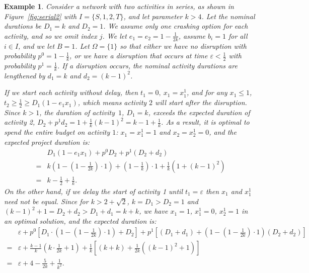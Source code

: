 \documentclass[11pt]{article}
\newtheorem{example}{Example}
\begin{document}
	\begin{example} \label{eg:delay}
		Consider a network with two activities in series, as shown in Figure~\ref{fig:serial2} with $I=\{S,1,2,T\}$, and let parameter \(k > 4\). Let the nominal durations be $D_1 = k$ and $D_2 = 1$. We assume only one crashing option for each activity, and so we omit index $j$. We let $e_1=e_2=1 - \frac{1}{2k}$, assume $b_i=1$ for all $i \in I$, and we let $B=1$. Let $\Omega=\{1\}$ so that either we have no disruption with probability $p^0=1 - \frac{1}{k}$, or we have a disruption that occurs at time $\varepsilon < \frac{1}{2}$ with probability $p^1=\frac{1}{k}$. If a disruption occurs, the nominal activity durations are lengthened by $d_1 = k$ and $d_2 = (k - 1)^2$. 
		
		If we start each activity without delay, then \(t_1 = 0,\ x_1=x_1^1\), and for any \(x_1 \leq 1\), \(t_2 \geq \frac{1}{2} \geq D_1(1 - e_1 x_1) \), which means activity \(2\) will start after the disruption. Since \(k > 1\), the duration of activity~\(1\), $D_1 = k$, exceeds the expected duration of activity 2, $ D_2 + p^1 d_2 = 1 + \frac{1}{k} (k-1)^2 = k - 1 + \frac{1}{k}$. As a result, it is optimal to spend the entire budget on activity \(1\): $x_1=x_1^1=1$ and $x_2=x_2^1=0$, and the expected project duration is: 
		\begin{align*}
			&D_1 (1 - e_1 x_1) + p^0 D_2 + p^1 (D_2 + d_2) \\
			= & k \left(1 - \left (1 - \frac{1}{2k} \right )\cdot 1 \right) + (1 - \frac{1}{k}) \cdot 1 + \frac{1}{k} \left(1 + (k -1)^2\right) \\
			= & k - \frac{1}{2} + \frac{1}{k}.
		\end{align*}
		On the other hand, if we delay the start of activity 1 until $t_1= \varepsilon$ then $x_1$ and $x_1^1$ need not be equal. Since for \(k > 2 + \sqrt{2}\), $k = D_1 > D_2 = 1$ and $(k - 1)^2 + 1 = D_2+d_2 > D_1 + d_1 = k + k$, we have $x_1=1$, $x_1^1=0$, $x_2^1=1$ in an optimal solution, and the expected duration is:
			\begin{align*}
				&\varepsilon + p^0 \left[D_1 \cdot \left(1 - (1 - \frac{1}{2k}) \cdot 1 \right) + D_2 \right]  + p^1 \left[(D_1 + d_1) + \left(1 - (1 - \frac{1}{2k}) \cdot 1 \right) (D_2 + d_2) \right]\\
				= & \varepsilon + \frac{k - 1}{k} \left(k \cdot \frac{1}{2k} + 1\right) + \frac{1}{k} \left[ (k + k) + \frac{1}{2k} \left((k-1)^2 + 1\right) \right] \\
				= & \varepsilon + 4 - \frac{5}{2k} + \frac{1}{k^2}.
			\end{align*}
	\end{example}
\end{document}
